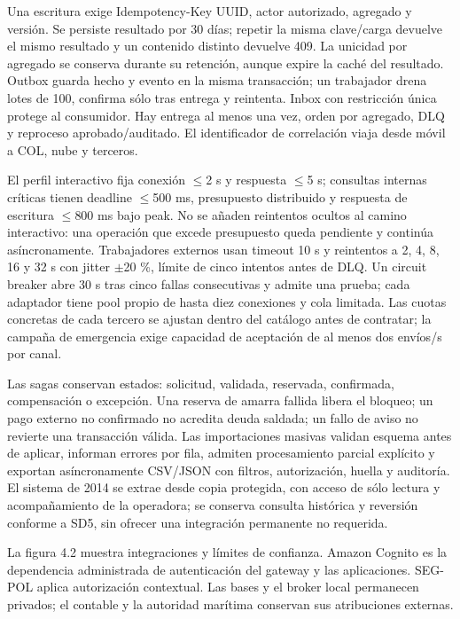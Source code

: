 \documentclass[11pt,letterpaper]{report}
\begin{document}
Una escritura exige Idempotency-Key UUID, actor autorizado, agregado y versión. Se persiste resultado por 30 días; repetir la misma clave/carga devuelve el mismo resultado y un contenido distinto devuelve 409. La unicidad por agregado se conserva durante su retención, aunque expire la caché del resultado. Outbox guarda hecho y evento en la misma transacción; un trabajador drena lotes de 100, confirma sólo tras entrega y reintenta. Inbox con restricción única protege al consumidor. Hay entrega al menos una vez, orden por agregado, DLQ y reproceso aprobado/auditado. El identificador de correlación viaja desde móvil a COL, nube y terceros.

El perfil interactivo fija conexión $\leq$2 s y respuesta $\leq$5 s; consultas internas críticas tienen deadline $\leq$500 ms, presupuesto distribuido y respuesta de escritura $\leq$800 ms bajo peak. No se añaden reintentos ocultos al camino interactivo: una operación que excede presupuesto queda pendiente y continúa asíncronamente. Trabajadores externos usan timeout 10 s y reintentos a 2, 4, 8, 16 y 32 s con jitter $\pm$20 \%, límite de cinco intentos antes de DLQ. Un circuit breaker abre 30 s tras cinco fallas consecutivas y admite una prueba; cada adaptador tiene pool propio de hasta diez conexiones y cola limitada. Las cuotas concretas de cada tercero se ajustan dentro del catálogo antes de contratar; la campaña de emergencia exige capacidad de aceptación de al menos dos envíos/s por canal.

Las sagas conservan estados: solicitud, validada, reservada, confirmada, compensación o excepción. Una reserva de amarra fallida libera el bloqueo; un pago externo no confirmado no acredita deuda saldada; un fallo de aviso no revierte una transacción válida. Las importaciones masivas validan esquema antes de aplicar, informan errores por fila, admiten procesamiento parcial explícito y exportan asíncronamente CSV/JSON con filtros, autorización, huella y auditoría. El sistema de 2014 se extrae desde copia protegida, con acceso de sólo lectura y acompañamiento de la operadora; se conserva consulta histórica y reversión conforme a SD5, sin ofrecer una integración permanente no requerida.

La figura 4.2 muestra integraciones y límites de confianza. Amazon Cognito es la dependencia administrada de autenticación del gateway y las aplicaciones. SEG-POL aplica autorización contextual. Las bases y el broker local permanecen privados; el contable y la autoridad marítima conservan sus atribuciones externas.
\end{document}

